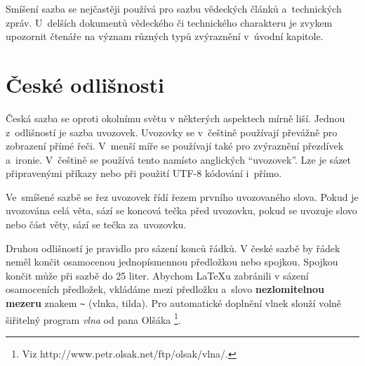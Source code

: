 \documentclass[11pt,twocolumn,a4paper]{article}
\begin{document}
Smíšení sazba se nejčastěji používá pro sazbu vědeckých článků a~technických zpráv. U~delších dokumentů vědeckého či technického charakteru je zvykem upozornit čtenáře na význam různých typů zvýraznění v~úvodní kapitole.

\section{České odlišnosti}

Česká sazba se oproti okolnímu světu v některých aspektech mírně liší. Jednou z~odlišností je sazba uvozovek. Uvozovky se v~češtině používají převážně pro zobrazení přímé řeči. V~menší míře se používají také pro zvýraznění přezdívek a~ironie. V~češtině se používá tento \textbf{} namísto anglických ``uvozovek''. Lze je sázet připravenými příkazy nebo při použití UTF-8 kódování i~přímo.

Ve~smíšené sazbě se řez uvozovek řídí řezem prvního uvozovaného slova. Pokud je uvozována celá věta, sází se koncová tečka před uvozovku, pokud se uvozuje slovo nebo část věty, sází se tečka za~uvozovku.

Druhou odlišností je pravidlo pro sázení konců řádků. V české sazbě by řádek neměl končit osamocenou jednopísmennou předložkou nebo spojkou. Spojkou  končit může při sazbě do 25 liter. Abychom \LaTeX u zabránili v sázení osamoceních předložek, vkládáme mezi předložku a~slovo \textbf{nezlomitelnou mezeru} znakem \verb|~| (vlnka, tilda). Pro automatické doplnění vlnek slouží volně šiřitelný program \emph{vlna} od pana Olšáka \footnote{Viz http://www.petr.olsak.net/ftp/olsak/vlna/.}.
\end{document}
